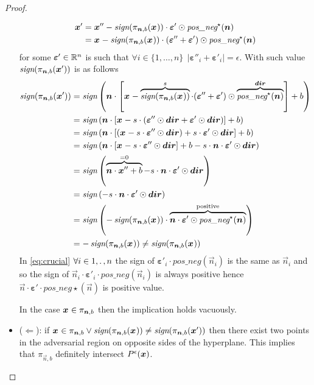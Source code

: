 \begin{proof}
\begin{itemize}
\begin{align*}
  \x[]' &= \x[]'' - \sign(\pi_{\vec{n}, b}(\x[]))\cdot \bm{\varepsilon}' \odot \textit{pos\_neg}^\star(\vec{n})\\
    &=  \x[] - \sign(\pi_{\vec{n}, b}(\x[]))\cdot (\bm{\varepsilon}'' + \bm{\varepsilon}') \odot \textit{pos\_neg}^\star(\vec{n})
\end{align*}
for some $\bm{\varepsilon}' \in \R$ is such that $\forall i \in \{1,\ldots,n\}\ \ |\bm{\varepsilon}''_i + \bm{\varepsilon}'_i| = \epsilon$. With such value $\sign(\pi_{\vec{n}, b}(\x[]'))$ is as follows
{\allowdisplaybreaks
\begin{align}
\sign(\pi_{\vec{n}, b}(\x[]'))
&= \sign\left(\vec{n} \cdot \left[\x[] - \overbrace{\sign(\pi_{\vec{n}, b}(\x[]))}^{s} \cdot (\bm{\varepsilon}'' + \bm{\varepsilon}') \odot \overbrace{\textit{pos\_neg}^\star(\vec{n})}^{\vec{dir}}\right] + b\right)  \nonumber \\
&= \sign\left(\vec{n} \cdot \left[\x[] - s \cdot \left(\bm{\varepsilon}''\odot \vec{dir} + \bm{\varepsilon}'\odot \vec{dir}\right)\right] + b\right)  \nonumber\\
&= \sign\left(\vec{n} \cdot \left[\left(\x[] - s \cdot \bm{\varepsilon}''\odot \vec{dir}\right) + s \cdot \bm{\varepsilon}'\odot \vec{dir}\right] + b\right) \nonumber \\
&= \sign\left(\vec{n} \cdot \left[\x[] - s \cdot \bm{\varepsilon}''\odot \vec{dir}\right] + b - s \cdot \vec{n} \cdot \bm{\varepsilon}'\odot \vec{dir}\right)  \nonumber \\
&= \sign\left(\overbrace{\vec{n} \cdot \x[]'' + b}^{=0} - s \cdot \vec{n} \cdot \bm{\varepsilon}'\odot \vec{dir}\right) \nonumber\\
&= \sign\left(- s \cdot \vec{n} \cdot \bm{\varepsilon}'\odot \vec{dir}\right)  \nonumber\\
&= \sign\left(- \sign(\pi_{\vec{n}, b}(\x[])) \cdot \overbrace{\vec{n} \cdot \bm{\varepsilon}'\odot \textit{pos\_neg}^\star(\vec{n})}^{\text{positive}}\right)\label{eq:crucial}\\
&= -\sign(\pi_{\vec{n}, b}(\x[])) \neq \sign(\pi_{\vec{n}, b}(\x[])) \nonumber
\end{align}
}
In \autoref{eq:crucial} $\forall i \in {1,\ldotp,n}$ the sign of $\bm{\varepsilon}'_i \cdot \textit{pos\_neg}(\vec{n}_i)$  is the same as $\vec{n}_i$ and so the sign of $\vec{n}_i \cdot \bm{\varepsilon}'_i \cdot \textit{pos\_neg}(\vec{n}_i)$ is always positive hence $\vec{n} \cdot \bm{\varepsilon}' \cdot \textit{pos\_neg}\star(\vec{n})$ is positive value.

In the case $\x[] \in \pi_{\vec{n}, b}$ then the implication holds vacuously.

\item  ($\Longleftarrow$): if $\x[] \in \pi_{\vec{n}, b} \vee \sign(\pi_{\vec{n}, b}(\x[])) \neq  \sign(\pi_{\vec{n}, b}(\x[]'))$ then there exist two points in the adversarial region on opposite sides of the hyperplane. This implies that $\pi_{\vec{n}, b}$ definitely intersect $\pert$.
\end{itemize}
\end{proof}


